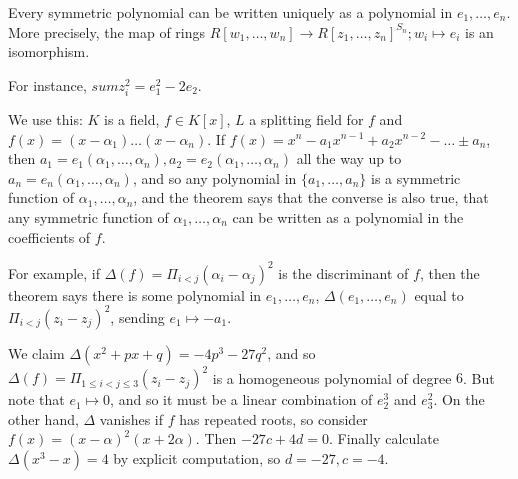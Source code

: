 \documentclass[a4paper, 10pt, twocolumn]{amsart}
\begin{document}
\begin{theorem}
Every symmetric polynomial can be written uniquely as a polynomial in $e_1, \ldots, e_n$. More precisely, the map of rings $R[w_1, \ldots, w_n] \to R[z_1, \ldots, z_n]^{S_n}; w_i \mapsto e_i$ is an isomorphism.
\end{theorem}
For instance, $sum z_i^2 = e_1^2 - 2e_2$.

We use this: $K$ is a field, $f \in K[x]$, $L$ a splitting field for $f$ and $f(x) = (x-\alpha_1)\ldots(x-\alpha_n)$. If $f(x) = x^n - a_1x^{n-1} +a_2x^{n-2} - \ldots \pm a_n$, then $a_1 = e_1(\alpha_1, \ldots, \alpha_n), a_2 = e_2(\alpha_1, \ldots, \alpha_n)$ all the way up to $a_n = e_n(\alpha_1, \ldots, \alpha_n)$, and so any polynomial in $\{a_1, \ldots, a_n\}$ is a symmetric function of $\alpha_1, \ldots, \alpha_n$, and the theorem says that the converse is also true, that any symmetric function of $\alpha_1, \ldots, \alpha_n$ can be written as a polynomial in the coefficients of $f$.

For example, if $\Delta(f) = \Pi_{i<j} (\alpha_i-\alpha_j)^2$ is the discriminant of $f$, then the theorem says there is some polynomial in $e_1, \ldots, e_n$, $\Delta(e_1, \ldots, e_n)$ equal to $\Pi_{i<j} (z_i - z_j)^2$, sending $e_1 \mapsto -a_1$.

We claim $\Delta(x^2+px+q) = -4p^3 - 27q^2$, and so $\Delta(f) = \Pi_{1\leq i<j\leq 3} (z_i-z_j)^2$ is a homogeneous polynomial of degree $6$. But note that $e_1 \mapsto 0$, and so it must be a linear combination of $e_2^3$ and $e_3^2$. On the other hand, $\Delta$ vanishes if $f$ has repeated roots, so consider $f(x) = (x-\alpha)^2(x+2\alpha)$. Then $-27c+4d = 0$. Finally calculate $\Delta(x^3-x) = 4$ by explicit computation, so $d = -27, c = -4.$
\end{document}
